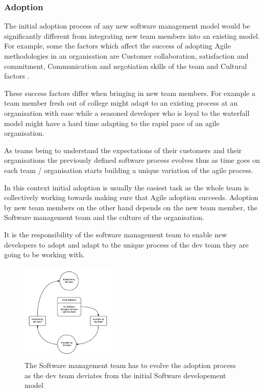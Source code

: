 \documentclass[12pt,conference]{IEEEtran}
\begin{document}
\subsubsection*{Adoption}

The initial adoption process of any new software management model would be significantly different from integrating new team members into an existing model. For example, some the factors which affect the success of adopting Agile methodologies in an organisation are 
Customer collaboration, satisfaction and commitment, Communication and negotiation skills of the team and Cultural factors \cite{misra_identifying_2009}.

These success factors differ when bringing in new team members. For example a team member fresh out of college might adapt to an existing process at an organisation with ease while a seasoned developer who is loyal to the waterfall model might have a hard time adapting to the rapid pace of an agile organisation. 

As teams being to understand the expectations of their customers and their organisations the previously defined software process evolves thus as time goes on each team / organisation starts building a unique variation of the agile process.

In this context initial adoption is usually the easiest task as the whole team is collectively working towards making sure that Agile adoption succeeds. Adoption by new team members on the other hand depends on the new team member, the Software management team and the culture of the organisation.

It is the responsibility of the software management team to enable new developers to adopt and adapt to the unique process of the dev team they are going to be working with.

\begin{figure}[t]
\centering
\includegraphics[width=0.4\textwidth]{sm_dev_team_process_evolution.png}
\caption{The Software management team has to evolve the adoption process as the dev team deviates from the initial Software developement model}
\end{figure}
\end{document}
